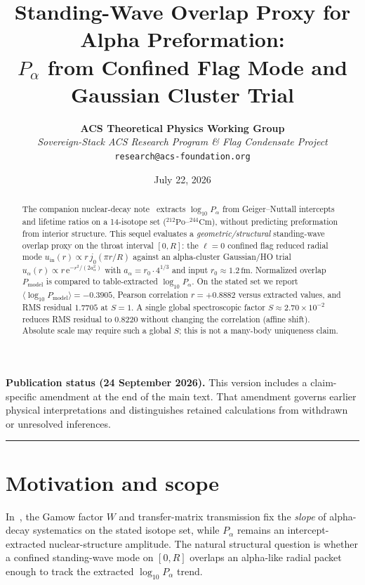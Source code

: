 \documentclass[11pt,a4paper]{article}
\title{\LARGE\bfseries Standing-Wave Overlap Proxy for Alpha Preformation:\\
$P_\alpha$ from Confined Flag Mode and Gaussian Cluster Trial}
\author{\textbf{ACS Theoretical Physics Working Group}\\[0.3em]
\small\textit{Sovereign-Stack ACS Research Program \& Flag Condensate Project}\\
\small\texttt{research@acs-foundation.org}}
\date{July 22, 2026}
\theoremstyle{remark}
\newcommand{\ee}{\mathrm{e}}
\begin{document}
\maketitle

\begin{abstract}
The companion nuclear-decay note~\cite{NuclearDecay2026} extracts
$\log_{10} P_\alpha$ from Geiger--Nuttall intercepts and lifetime ratios
on a 14-isotope set ($^{212}\mathrm{Po}$--$^{244}\mathrm{Cm}$), without
predicting preformation from interior structure.  This sequel evaluates a
\emph{geometric/structural} standing-wave overlap proxy on the throat
interval $[0,R]$: the $\ell=0$ confined flag reduced radial mode
$u_{\mathrm{in}}(r)\propto r\,j_0(\pi r/R)$ against an alpha-cluster
Gaussian/HO trial $u_\alpha(r)\propto r\,\ee^{-r^2/(2a_\alpha^2)}$ with
$a_\alpha=r_0\cdot 4^{1/3}$ and input $r_0\approx 1.2\,\mathrm{fm}$.
Normalized overlap $P_{\mathrm{model}}$ is compared to table-extracted
$\log_{10} P_\alpha$.  On the stated set we report
$\langle\log_{10} P_{\mathrm{model}}\rangle=-0.3905$, Pearson correlation
$r=+0.8882$ versus extracted values, and RMS residual $1.7705$ at $S=1$.
A single global spectroscopic factor $S\approx 2.70\times 10^{-2}$
reduces RMS residual to $0.8220$ without changing the correlation
(affine shift).  Absolute scale may require such a global $S$; this is
not a many-body uniqueness claim.
\end{abstract}
\par\smallskip\noindent\textbf{Publication status (24 September 2026).}
This version includes a claim-specific amendment at the end of the main text.
That amendment governs earlier physical interpretations and distinguishes
retained calculations from withdrawn or unresolved inferences.\par\smallskip


\vspace{0.1em}
\hrule
\vspace{0.4em}

\section{Motivation and scope}

In~\cite{NuclearDecay2026}, the Gamow factor $W$ and transfer-matrix
transmission fix the \emph{slope} of alpha-decay systematics on the stated
isotope set, while $P_\alpha$ remains an intercept-extracted nuclear-structure
amplitude.  The natural structural question is whether a confined
standing-wave mode on $[0,R]$ overlaps an alpha-like radial packet enough
to track the extracted $\log_{10} P_\alpha$ trend.
\end{document}
